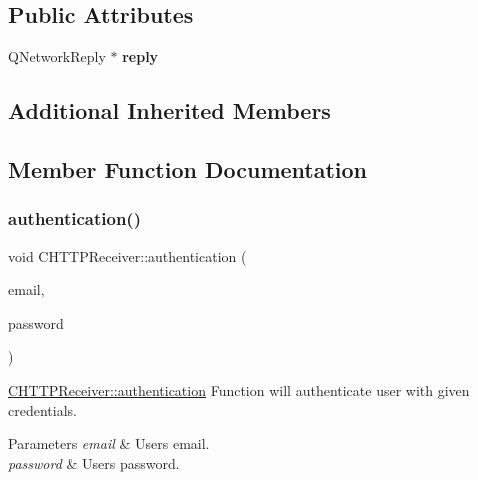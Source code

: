 \subsection*{Public Attributes}
\begin{DoxyCompactItemize}
\item 
\mbox{\label{classCHTTPReceiver_a6761fc61759945cece8b8192e722b838}} 
Q\+Network\+Reply $\ast$ {\bfseries reply}
\end{DoxyCompactItemize}
\subsection*{Additional Inherited Members}


\subsection{Member Function Documentation}
\mbox{\label{classCHTTPReceiver_af4be4d5ce59a99993417786637f7cc64}} 
\subsubsection{\texorpdfstring{authentication()}{authentication()}}
{\footnotesize\ttfamily void C\+H\+T\+T\+P\+Receiver\+::authentication (\begin{DoxyParamCaption}\item[{const Q\+String}]{email,  }\item[{const Q\+String}]{password }\end{DoxyParamCaption})\hspace{0.3cm}{\ttfamily [virtual]}}



\hyperlink{classCHTTPReceiver_af4be4d5ce59a99993417786637f7cc64}{C\+H\+T\+T\+P\+Receiver\+::authentication} Function will authenticate user with given credentials. 


\begin{DoxyParams}{Parameters}
{\em email} & User\textquotesingle{}s email. \\
\hline
{\em password} & User\textquotesingle{}s password. \\
\hline
\end{DoxyParams}


